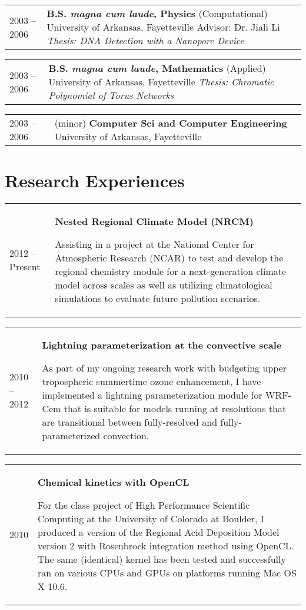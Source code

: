 \documentclass[overlap,12pt,centered]{res}
\makeatletter
\newcommand{\tabulated}{\begin{tabular}{@{}p{1.4in}p{4.9in}}}
\makeatother
\begin{document}
\begin{resume}
		\tabulated						
			2003 -- 2006	& {\bf B.S. {\it magna cum laude}, Physics} (Computational) \newline
						University of Arkansas, Fayetteville \newline
						{Advisor: Dr. Jiali Li} \newline
						{\it Thesis: DNA Detection with a Nanopore Device}
		\end{tabular}
		
		\tabulated						
			2003 -- 2006	& {\bf B.S. {\it magna cum laude},  Mathematics} (Applied) \newline
						University of Arkansas, Fayetteville \newline
						{\it Thesis: Chromatic Polynomial of Torus Networks}
		\end{tabular}
		
		\tabulated						
			2003 -- 2006	&  (minor) {\bf Computer Sci and Computer Engineering} \newline
						University of Arkansas, Fayetteville
		\end{tabular}

		\section{\sc Research Experiences}		
		\tabulated
			2012 -- Present	&	{\bf Nested Regional Climate Model (NRCM)}
				
				Assisting in a project at the National Center for Atmospheric Research (NCAR) to test and develop the regional chemistry module for a next-generation climate model across scales as well as utilizing climatological simulations to evaluate future pollution scenarios.
		\end{tabular}
		
		\tabulated
			2010 -- 2012	&	{\bf Lightning parameterization at the convective scale}
				
				As part of my ongoing research work with budgeting upper tropospheric summertime ozone enhancement, I have implemented a lightning parameterization module for WRF-Cem that is suitable for models running at resolutions that are transitional between fully-resolved and fully-parameterized convection.
		\end{tabular}
		
		\tabulated
			2010			&	{\bf Chemical kinetics with OpenCL}
				
				For the class project of High Performance Scientific Computing at the University of Colorado at Boulder, I produced a version of the Regional Acid Deposition Model version 2 with Rosenbrock integration method using OpenCL. The same (identical) kernel has been tested and successfully ran on  various CPUs and GPUs on platforms running Mac OS X 10.6.
		\end{tabular}


\end{resume}
\end{document}

